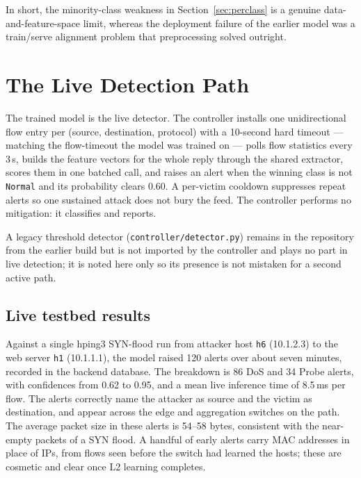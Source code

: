 \documentclass[11pt]{article}
\begin{document}
In short, the minority-class weakness in Section~\ref{sec:perclass} is a genuine
data-and-feature-space limit, whereas the deployment failure of the earlier model was a
train/serve alignment problem that preprocessing solved outright.

\section{The Live Detection Path}
\label{sec:live}
The trained model is the live detector. The controller installs one unidirectional flow
entry per (source, destination, protocol) with a 10-second hard timeout --- matching the
flow-timeout the model was trained on --- polls flow statistics every 3\,s, builds the
feature vectors for the whole reply through the shared extractor, scores them in one
batched call, and raises an alert when the winning class is not \texttt{Normal} and its
probability clears 0.60. A per-victim cooldown suppresses repeat alerts so one sustained
attack does not bury the feed. The controller performs no mitigation: it classifies and
reports.

A legacy threshold detector (\texttt{controller/detector.py}) remains in the repository
from the earlier build but is not imported by the controller and plays no part in live
detection; it is noted here only so its presence is not mistaken for a second active path.

\subsection{Live testbed results}
Against a single hping3 SYN-flood run from attacker host \texttt{h6} (10.1.2.3) to the web
server \texttt{h1} (10.1.1.1), the model raised 120 alerts over about seven minutes,
recorded in the backend database. The breakdown is 86 DoS and 34 Probe alerts, with
confidences from 0.62 to 0.95, and a mean live inference time of 8.5\,ms per flow. The
alerts correctly name the attacker as source and the victim as destination, and appear
across the edge and aggregation switches on the path. The average packet size in these
alerts is 54--58 bytes, consistent with the near-empty packets of a SYN flood. A handful
of early alerts carry MAC addresses in place of IPs, from flows seen before the switch had
learned the hosts; these are cosmetic and clear once L2 learning completes.
\end{document}
